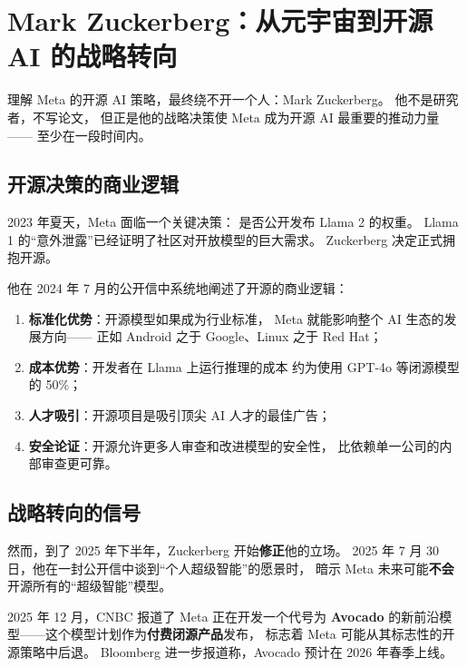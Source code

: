 \section{Mark Zuckerberg：从元宇宙到开源 AI 的战略转向}
\label{sec:zuckerberg}

理解 Meta 的开源 AI 策略，最终绕不开一个人：Mark Zuckerberg。
他不是研究者，不写论文，
但正是他的战略决策使 Meta 成为开源 AI 最重要的推动力量——
至少在一段时间内。

\subsection{开源决策的商业逻辑}

2023 年夏天，Meta 面临一个关键决策：
是否公开发布 Llama 2 的权重。
Llama 1 的``意外泄露''已经证明了社区对开放模型的巨大需求。
Zuckerberg 决定正式拥抱开源。

他在 2024 年 7 月的公开信中系统地阐述了开源的商业逻辑：

\begin{enumerate}
  \item \textbf{标准化优势}：开源模型如果成为行业标准，
    Meta 就能影响整个 AI 生态的发展方向——
    正如 Android 之于 Google、Linux 之于 Red Hat；
  \item \textbf{成本优势}：开发者在 Llama 上运行推理的成本
    约为使用 GPT-4o 等闭源模型的 50\%；
  \item \textbf{人才吸引}：开源项目是吸引顶尖 AI 人才的最佳广告；
  \item \textbf{安全论证}：开源允许更多人审查和改进模型的安全性，
    比依赖单一公司的内部审查更可靠。
\end{enumerate}

\subsection{战略转向的信号}

然而，到了 2025 年下半年，Zuckerberg 开始\textbf{修正}他的立场。
2025 年 7 月 30 日，他在一封公开信中谈到``个人超级智能''的愿景时，
暗示 Meta 未来可能\textbf{不会}开源所有的``超级智能''模型。

2025 年 12 月，CNBC 报道了 Meta 正在开发一个代号为 \textbf{Avocado}
的新前沿模型——这个模型计划作为\textbf{付费闭源产品}发布，
标志着 Meta 可能从其标志性的开源策略中后退。
Bloomberg 进一步报道称，Avocado 预计在 2026 年春季上线。

